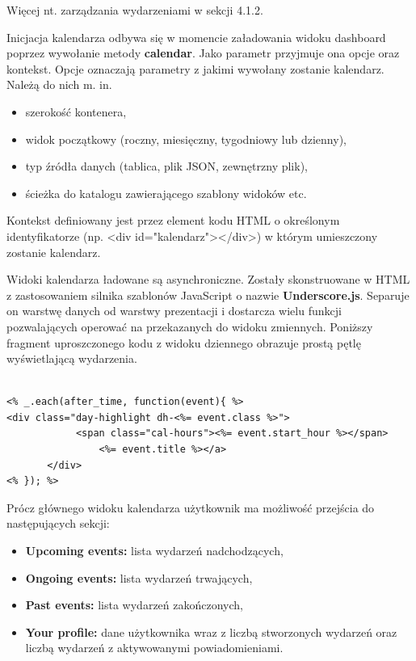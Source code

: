 Więcej nt. zarządzania wydarzeniami w sekcji 4.1.2.

Inicjacja kalendarza odbywa się w momencie załadowania widoku dashboard poprzez wywołanie metody \textbf{calendar}. Jako parametr przyjmuje ona opcje oraz kontekst. Opcje oznaczają parametry z jakimi wywołany zostanie kalendarz. Należą do nich m. in.

\begin{itemize}
\item szerokość kontenera,
\item widok początkowy (roczny, miesięczny, tygodniowy lub dzienny),
\item typ źródła danych (tablica, plik JSON, zewnętrzny plik),
\item ścieżka do katalogu zawierającego szablony widoków etc.
\end{itemize}

Kontekst definiowany jest przez element kodu HTML o określonym identyfikatorze (np. <div id="kalendarz"></div>) w którym umieszczony zostanie kalendarz.

Widoki kalendarza ładowane są asynchroniczne. Zostały skonstruowane w HTML z zastosowaniem silnika szablonów JavaScript o nazwie \textbf{Underscore.js}. Separuje on warstwę danych od warstwy prezentacji i dostarcza wielu funkcji pozwalających operować na przekazanych do widoku zmiennych. Poniższy fragment uproszczonego kodu z widoku dziennego obrazuje prostą pętlę wyświetlającą wydarzenia.

\begin{lstlisting}[caption=Fragment kodu prezentujący składnię Underscore.js., label=amb, captionpos=b]

<% _.each(after_time, function(event){ %>
<div class="day-highlight dh-<%= event.class %>">
       		<span class="cal-hours"><%= event.start_hour %></span>
              	<%= event.title %></a>
       </div>
<% }); %>

\end{lstlisting}

Prócz głównego widoku kalendarza użytkownik ma możliwość przejścia do następujących sekcji:

\begin{itemize}
\item \textbf{Upcoming events:} lista wydarzeń nadchodzących,
\item \textbf{Ongoing events:} lista wydarzeń trwających,
\item \textbf{Past events:} lista wydarzeń zakończonych,
\item \textbf{Your profile:} dane użytkownika wraz z liczbą stworzonych wydarzeń oraz liczbą wydarzeń z aktywowanymi powiadomieniami.
\end{itemize}


